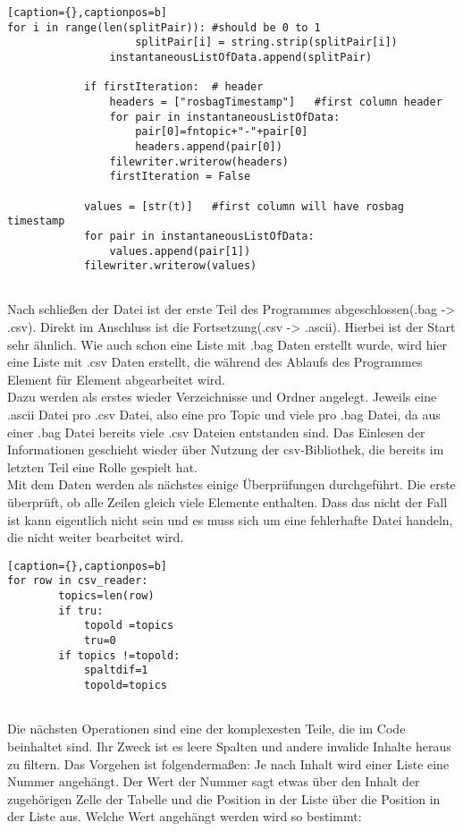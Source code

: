\documentclass[11pt]{scrartcl}
\begin{document}
\begin{onehalfspace}
\begin{lstlisting}[basicstyle=\small][caption={},captionpos=b]
for i in range(len(splitPair)):	#should be 0 to 1
					splitPair[i] = string.strip(splitPair[i])
				instantaneousListOfData.append(splitPair)

			if firstIteration:	# header
				headers = ["rosbagTimestamp"]	#first column header
				for pair in instantaneousListOfData:
					pair[0]=fntopic+"-"+pair[0]
					headers.append(pair[0])
				filewriter.writerow(headers)
				firstIteration = False

			values = [str(t)]	#first column will have rosbag timestamp
			for pair in instantaneousListOfData:
				values.append(pair[1])
			filewriter.writerow(values)
			
\end{lstlisting}

Nach schließen der Datei ist der erste Teil des Programmes abgeschlossen(.bag -> .csv). Direkt im Anschluss ist die Fortsetzung(.csv -> .ascii). Hierbei ist der Start sehr ähnlich. Wie auch schon eine Liste mit .bag Daten erstellt wurde, wird hier eine Liste mit .csv Daten erstellt, die während des Ablaufs des Programmes Element für Element abgearbeitet wird.\\
Dazu werden als erstes wieder Verzeichnisse und Ordner angelegt. Jeweils eine .ascii Datei pro .csv Datei, also eine pro Topic und viele pro .bag Datei, da aus einer .bag Datei bereits viele .csv Dateien entstanden sind. Das Einlesen der Informationen geschieht wieder über Nutzung der csv-Bibliothek, die bereits im letzten Teil eine Rolle gespielt hat.\\
Mit dem Daten werden als nächstes einige Überprüfungen durchgeführt.
Die erste überprüft, ob alle Zeilen gleich viele Elemente enthalten. Dass das nicht der Fall ist kann eigentlich nicht sein und es muss sich um eine fehlerhafte Datei handeln, die nicht weiter bearbeitet wird.\\


\begin{lstlisting}[basicstyle=\small][caption={},captionpos=b]
for row in csv_reader:
		topics=len(row)
		if tru:
			topold =topics
			tru=0
		if topics !=topold:
			spaltdif=1
			topold=topics
			
\end{lstlisting}

Die nächsten Operationen sind eine der komplexesten Teile, die im Code beinhaltet sind. Ihr Zweck ist es leere Spalten und andere invalide Inhalte heraus zu filtern. Das Vorgehen ist folgendermaßen: Je nach Inhalt wird einer Liste eine Nummer angehängt. Der Wert der Nummer sagt etwas über den Inhalt der zugehörigen Zelle der Tabelle und die Position in der Liste über die Position in der Liste aus. Welche Wert angehängt werden wird so bestimmt:


\end{onehalfspace}
\end{document}
